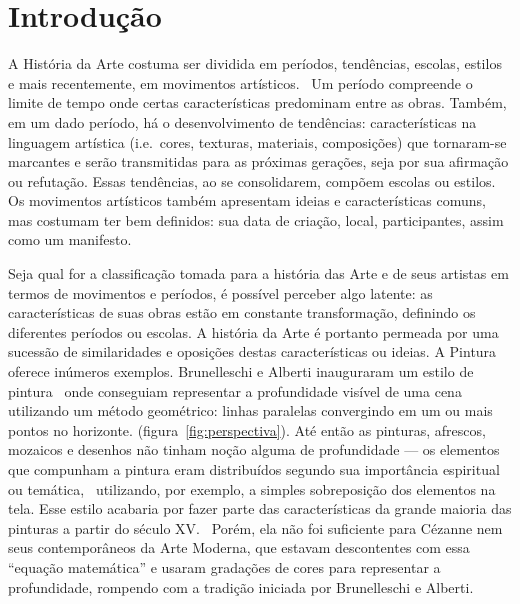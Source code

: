 

\afterpage{\blankpage}
\chapter{Introdução}
\label{cap:intro} 

A História da Arte costuma ser dividida em períodos, tendências,
escolas, estilos e mais recentemente, em movimentos
artísticos.~\cite{dempsey} Um período compreende o limite de tempo
onde certas características predominam entre as obras. Também, em um dado
período, há o desenvolvimento de tendências: características na
linguagem artística (i.e.\ cores, texturas, materiais, composições)
que tornaram-se marcantes e serão transmitidas para as
próximas gerações, seja por sua afirmação ou refutação. Essas
tendências, ao se consolidarem, compõem escolas ou
estilos. Os movimentos artísticos também apresentam ideias e
características comuns, mas costumam ter bem definidos: sua data de
criação, local, participantes, assim como um manifesto.

Seja qual for a classificação tomada para a história das Arte e de
seus artistas em termos de movimentos e períodos, é possível perceber
algo latente: as características de suas obras estão em constante
transformação, definindo os diferentes períodos ou escolas. A história
da Arte é portanto permeada por uma sucessão de similaridades e
oposições destas características ou ideias. A Pintura oferece inúmeros
exemplos. Brunelleschi e Alberti inauguraram um estilo de
pintura~\cite{andersen,kemp} onde conseguiam representar a
profundidade visível de uma cena utilizando um método geométrico:
linhas paralelas convergindo em um ou mais pontos no horizonte.
(figura~\ref{fig:perspectiva}). Até então as pinturas, afrescos,
mozaicos e desenhos não tinham noção alguma de profundidade --- os
elementos que compunham a pintura eram distribuídos segundo sua
importância espiritual ou temática,~\cite{edgerton} utilizando, por
exemplo, a simples sobreposição dos elementos na tela. Esse estilo
acabaria por fazer parte das características da grande maioria das
pinturas a partir do século XV.~\cite{gombrich} Porém, ela não foi
suficiente para Cézanne nem seus contemporâneos da Arte Moderna, que
estavam descontentes com essa ``equação matemática'' e usaram
gradações de cores para representar a profundidade, rompendo com a
tradição iniciada por Brunelleschi e Alberti.~\cite{sedlmayr}

